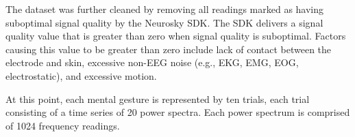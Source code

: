The dataset was further cleaned by removing all readings marked as having suboptimal signal quality by the Neurosky SDK. The SDK delivers a signal quality value that is greater than zero when signal quality is suboptimal. Factors causing this value to be greater than zero include lack of contact between the electrode and skin, excessive non-EEG noise (e.g., EKG, EMG, EOG, electrostatic), and excessive motion.

At this point, each mental gesture is represented by ten trials, each trial consisting of a time series of 20 power spectra. Each power spectrum is comprised of 1024 frequency readings. 